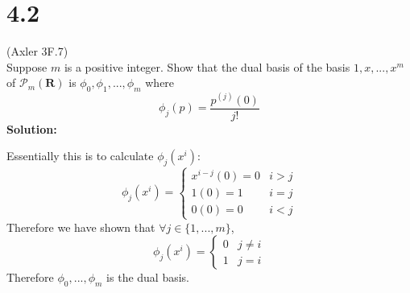\documentclass{article}
\begin{document}
\section*{4.2}
(Axler 3F.7)\\
Suppose $m$ is a positive integer. Show that the dual basis of the basis $1, x, ..., x^m$ of $\mathcal{P}_m(\mathbf{R})$ is $\phi_0, \phi_1, ..., \phi_m$ where
\begin{equation*}
    \phi_j(p) = \frac{p^{(j)}(0)}{j!}
\end{equation*}
\textbf{Solution:}
\begin{addmargin}[1em]{0em}
    Essentially this is to calculate $\phi_j(x^i)$:
    \begin{equation*}
        \phi_j(x^i) = \begin{cases}
            x^{i-j}(0) = 0 & i > j\\
            1(0) = 1 & i = j\\
            0(0) = 0 & i < j
        \end{cases}
    \end{equation*}
    Therefore we have shown that $\forall j \in \{1, ..., m\}$,
    \begin{equation*}
        \phi_j(x^i) = \begin{cases}
            0 & j \neq i\\
            1 & j = i
        \end{cases}
    \end{equation*}
    Therefore $\phi_0, ..., \phi_m$ is the dual basis.
\end{addmargin}
\end{document}
